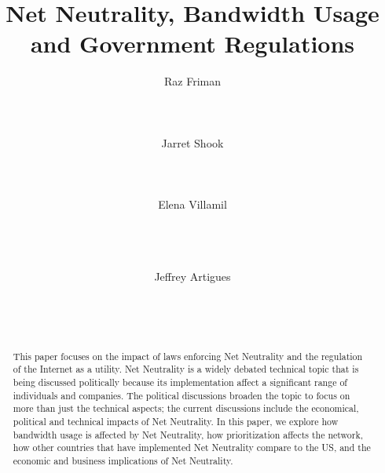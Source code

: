\documentclass{sigcomm-alternate}
\begin{document}
\title{Net Neutrality, Bandwidth Usage and Government Regulations}
	

\author{
	\alignauthor
	Raz Friman\\
	\\
	\\
	\\
	\alignauthor
	Jarret Shook\\
	\\
	\\
	\\
	\alignauthor Elena Villamil\\
	\\
	\\
	\\
	\and  %
	\alignauthor Jeffrey Artigues\\
	\\
	\\
	\\
}

\maketitle

\begin{abstract}
This paper focuses on the impact of laws enforcing Net Neutrality and the regulation of the Internet as a utility. Net Neutrality is a widely debated technical topic that is being discussed politically because its implementation affect a significant range of individuals and companies.  The political discussions broaden the topic to focus on more than just the technical aspects; the current discussions include the economical, political and technical impacts of Net Neutrality. In this paper, we explore how bandwidth usage is affected by Net Neutrality, how prioritization affects the network, how other countries that have implemented Net Neutrality compare to the US, and the economic and business implications of Net Neutrality. 
\end{abstract}
\end{document}
